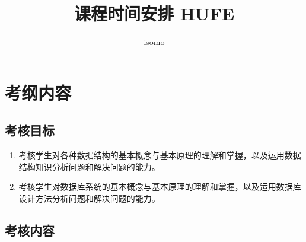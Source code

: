 \documentclass{../note}
\title{课程时间安排 HUFE}
\author{isomo}
\begin{document}
\maketitle

\section{考纲内容}

\subsection{考核目标}
\begin{enumerate}
  \item 考核学生对各种数据结构的基本概念与基本原理的理解和掌握，以及运用数据结构知识分析问题和解决问题的能力。
  \item 考核学生对数据库系统的基本概念与基本原理的理解和掌握，以及运用数据库设计方法分析问题和解决问题的能力。
\end{enumerate}

\subsection{考核内容}
\end{document}
